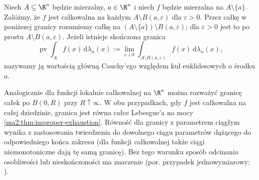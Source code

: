 \begin{definicja}
\label{ma2:def:improper-principal-value}
Niech $A\subseteq\R^n$ będzie mierzalny,
$a\in\R^n$ i niech $f$ będzie mierzalna
na $A\setminus\{a\}$. Załóżmy, że $f$
jest całkowalna na każdym
$A\setminus B(a,\varepsilon)$ dla $\varepsilon>0$.
Przez całkę w poniższej granicy rozumiemy
całkę na $(A\setminus\{a\})\setminus B(a,\varepsilon)$;
dla $\varepsilon>0$ jest to po prostu
$A\setminus B(a,\varepsilon)$.
Jeżeli istnieje skończona granica
\[
 \operatorname{pv}\int_A f(x)\,\mathrm d\lambda_n(x)
 :=\lim_{\varepsilon\downarrow0}
 \int_{A\setminus B(a,\varepsilon)}
 f(x)\,\mathrm d\lambda_n(x),
\]
nazywamy ją wartością główną Cauchy'ego
względem kul euklidesowych o środku $a$.
\end{definicja}

Analogicznie dla funkcji lokalnie całkowalnej
na $\R^n$ można rozważyć granicę całek
po $B(0,R)$ przy $R\uparrow\infty$.
W obu przypadkach, gdy $f$ jest całkowalna
na całej dziedzinie, granica jest równa
całce Lebesgue'a na mocy
\ref{ma2:thm:improper-exhaustion}.
Równość dla granicy z parametrem ciągłym
wynika z zastosowania twierdzenia do dowolnego
ciągu parametrów dążącego do odpowiedniego
końca zakresu (dla funkcji całkowalnej także
ciągi niemonotoniczne dają tę samą granicę).
Bez tego warunku sposób odcinania
osobliwości lub nieskończoności ma znaczenie
(por. przypadek jednowymiarowy:
).

